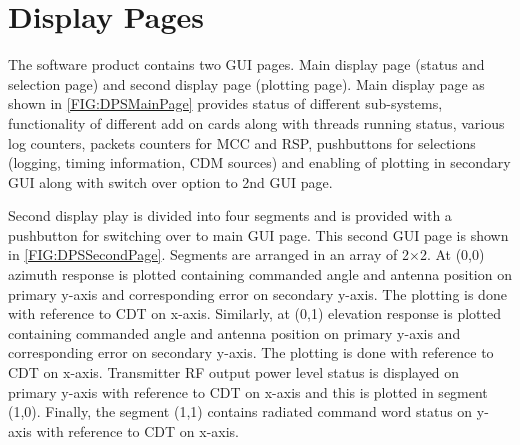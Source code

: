 \chapter{Display Pages}
\label{Chapter10}
The software product contains two GUI pages. Main display page (status and selection page) and second display page (plotting page).
Main display page as shown in \ref{FIG:DPSMainPage} provides status of different sub-systems, functionality of different add on cards along with threads running status, various log counters, packets counters for MCC and RSP, pushbuttons for selections (logging, timing information, CDM sources) and enabling of plotting in secondary GUI along with switch over option to 2nd GUI page. \newline

Second display play is divided into four segments and is provided with a pushbutton for switching over to main GUI page. This second GUI page is shown in \ref{FIG:DPSSecondPage}. Segments are arranged in an array of 2$\times$2. At (0,0) azimuth response is plotted containing commanded angle and antenna position on primary y-axis and corresponding error on secondary y-axis. The plotting is done with reference to CDT on x-axis. Similarly, at (0,1) elevation response is plotted containing commanded angle and antenna position on primary y-axis and corresponding error on secondary y-axis. The plotting is done with reference to CDT on x-axis. Transmitter RF output power level status is displayed on primary y-axis with reference to CDT on x-axis and this is plotted in segment (1,0). Finally, the segment (1,1) contains radiated command word status on y-axis with reference to CDT on x-axis.

